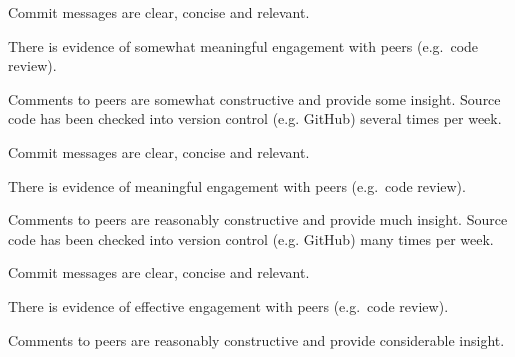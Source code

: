 \documentclass{../../fal_assignment}
\begin{document}
\begin{markingrubric}
            \par Commit messages are clear, concise and relevant.
            \par There is evidence of somewhat meaningful engagement with peers (e.g.\ code review).
            \par Comments to peers are somewhat constructive and provide some insight.
        \grade Source code has been checked into version control (e.g. GitHub) several times per week.
            \par Commit messages are clear, concise and relevant.
            \par There is evidence of meaningful engagement with peers (e.g.\ code review).
            \par Comments to peers are reasonably constructive and provide much insight.
        \grade Source code has been checked into version control (e.g. GitHub) many times per week.
            \par Commit messages are clear, concise and relevant.
            \par There is evidence of effective engagement with peers (e.g.\ code review).
            \par Comments to peers are reasonably constructive and provide considerable insight.
%
\end{markingrubric}
\end{document}
